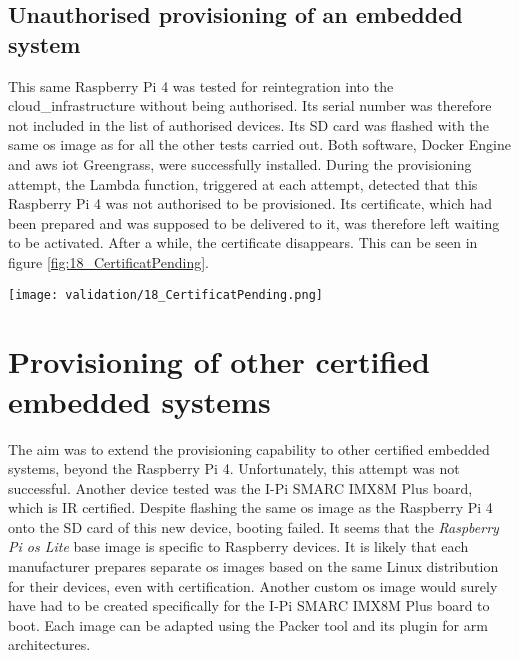 \subsection{Unauthorised provisioning of an embedded system}
This same Raspberry Pi 4 was tested for reintegration into the \gls{cloud_infrastructure} without being authorised. Its serial number was therefore not included in the list of authorised devices. Its SD card was flashed with the same \acrshort{os} image as for all the other tests carried out. Both software, Docker Engine and \gls{aws} \acrshort{iot} Greengrass, were successfully installed. During the provisioning attempt, the Lambda function, triggered at each attempt, detected that this Raspberry Pi 4 was not authorised to be provisioned. Its certificate, which had been prepared and was supposed to be delivered to it, was therefore left waiting to be activated. After a while, the certificate disappears. This can be seen in figure \ref{fig:18_CertificatPending}.
\begin{center}
    \begingroup
    \texttt{[image: validation/18\_CertificatPending.png]}
    \label{fig:18_CertificatPending}
    \endgroup
\end{center}

\section{Provisioning of other \texorpdfstring{}{} certified embedded systems}

The aim was to extend the provisioning capability to other  certified embedded systems, beyond the Raspberry Pi 4. Unfortunately, this attempt was not successful. Another device tested was the I-Pi SMARC IMX8M Plus board, which is  IR certified. Despite flashing the same \acrshort{os} image as the Raspberry Pi 4 onto the SD card of this new device, booting failed. It seems that the \textit{Raspberry Pi \acrshort{os} Lite} base image is specific to Raspberry devices. It is likely that each manufacturer prepares separate \acrshort{os} images based on the same Linux distribution for their devices, even with  certification. Another custom \acrshort{os} image would surely have had to be created specifically for the I-Pi SMARC IMX8M Plus board to boot. Each image can be adapted using the Packer tool and its plugin for \gls{arm} architectures.

